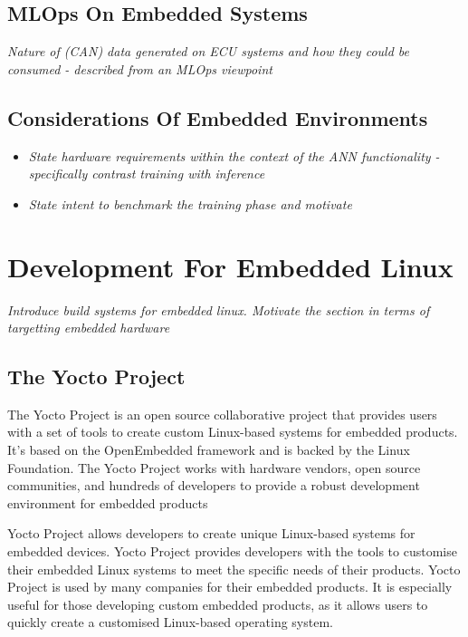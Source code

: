 \subsection[Machine Learning on Embedded Devices]{MLOps On Embedded Systems}
\textit{Nature of (CAN) data generated on ECU systems and how they could be consumed - described from an MLOps viewpoint }

\subsection[Considerations of Embedded Environments]{Considerations Of Embedded Environments}
\begin{itemize}
	\item \textit{State hardware requirements within the context of the ANN functionality - specifically contrast training with inference}
	\item \textit{State intent to benchmark the training phase and motivate}
\end{itemize}

\section[Development Process for Embedded Linux]{Development For Embedded Linux}
\textit{Introduce build systems for embedded linux. Motivate the section in terms of targetting embedded hardware}

\subsection[Build Systems : The Yocto Project]{The Yocto Project}
The Yocto Project is an open source collaborative project that provides users with a set of tools to create custom Linux-based systems for embedded products. It's based on the OpenEmbedded framework and is backed by the Linux Foundation. The Yocto Project works with hardware vendors, open source communities, and hundreds of developers to provide a robust development environment for embedded products

Yocto Project allows developers to create unique Linux-based systems for embedded devices. Yocto Project provides developers with the tools to customise their embedded Linux systems to meet the specific needs of their products. Yocto Project is used by many companies for their embedded products. It is especially useful for those developing custom embedded products, as it allows users to quickly create a customised Linux-based operating system.

